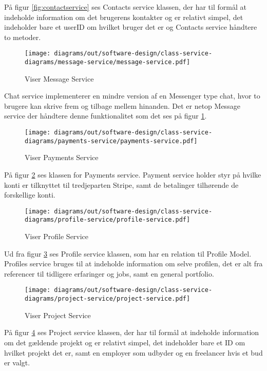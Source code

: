 På figur \ref{fig:contactservice} ses Contacts service klassen, der har til formål at indeholde information om det brugerens kontakter og er relativt simpel, det indeholder bare et userID om hvilket bruger det er og Contacts service håndtere to metoder. 

\begin{figure}[H]
    \centering
\texttt{[image: diagrams/out/software-design/class-service-diagrams/message-service/message-service.pdf]}
\caption{Viser Message Service}
\label{fig:messageservice}
\end{figure}

Chat service implementerer en mindre version af en Messenger type chat, hvor to brugere kan skrive frem og tilbage mellem hinanden. Det er netop Message service der håndtere denne funktionalitet som det ses på figur \ref{fig:messageservice}.

\newpage
\begin{figure}[H]
    \centering
\texttt{[image: diagrams/out/software-design/class-service-diagrams/payments-service/payments-service.pdf]}
\caption{Viser Payments Service}
\label{fig:paymentsService}
\end{figure}

På figur \ref{fig:paymentsService} ses klassen for Payments service. Payment service holder styr på hvilke konti er tilknyttet til tredjeparten Stripe, samt de betalinger tilhørende de forskellige konti.

\newpage
\begin{figure}[H]
    \centering
\texttt{[image: diagrams/out/software-design/class-service-diagrams/profile-service/profile-service.pdf]}
\caption{Viser Profile Service}
\label{fig:profileservice}
\end{figure}

Ud fra figur \ref{fig:profileservice} ses Profile service klassen, som har en relation til Profile Model.
Profiles service bruges til at indeholde information om selve profilen, det er alt fra referencer til tidligere erfaringer og jobs, samt en general portfolio.

\begin{figure}[H]
    \centering
\texttt{[image: diagrams/out/software-design/class-service-diagrams/project-service/project-service.pdf]}
\caption{Viser Project Service}
\label{fig:projectservice}
\end{figure}

På figur \ref{fig:projectservice} ses Project service klassen, der har til formål at indeholde information om det gældende projekt og er relativt simpel, det indeholder bare et ID om hvilket projekt det er, samt en employer som udbyder og en freelancer hvis et bud er valgt.

